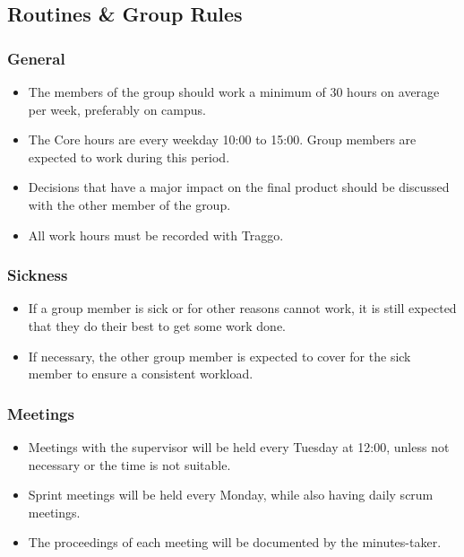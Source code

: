 \subsection{Routines \& Group Rules}

\subsubsection{General}

\begin{itemize}
    \item The members of the group should work a minimum of 30 hours on average per week, preferably on campus.
    \item The Core hours are every weekday 10:00 to 15:00. Group members are expected to work during this period.
    \item Decisions that have a major impact on the final product should be discussed with the other member of the group.
    \item All work hours must be recorded with Traggo.
\end{itemize}

\subsubsection{Sickness}

\begin{itemize}
    \item If a group member is sick or for other reasons cannot work, it is still expected that they do their best to get some work done.
    \item If necessary, the other group member is expected to cover for the sick member to ensure a consistent workload.
\end{itemize}

\subsubsection{Meetings}

\begin{itemize}
    \item Meetings with the supervisor will be held every Tuesday at 12:00, unless not necessary or the time is not suitable.
    \item Sprint meetings will be held every Monday, while also having daily scrum meetings.
    \item The proceedings of each meeting will be documented by the minutes-taker.
\end{itemize}

